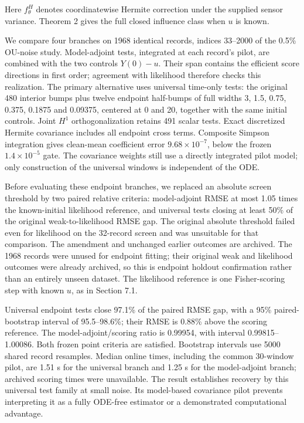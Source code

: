 \documentclass[
  american,
  11pt,
]{article}
\begin{document}
Here \(f_\theta^H\) denotes coordinatewise Hermite correction under the
supplied sensor variance. Theorem 2 gives the full closed influence
class when \(u\) is known.

We compare four branches on 1968 identical records, indices 33--2000 of
the 0.5\% OU-noise study. Model-adjoint tests, integrated at each
record's pilot, are combined with the two controls \(Y(0)-u\). Their
span contains the efficient score directions in first order; agreement
with likelihood therefore checks this realization. The primary
alternative uses universal time-only tests: the original 480 interior
bumps plus twelve endpoint half-bumps of full widths 3, 1.5, 0.75,
0.375, 0.1875 and 0.09375, centered at 0 and 20, together with the same
initial controls. Joint \(H^1\) orthogonalization retains 491 scalar
tests. Exact discretized Hermite covariance includes all endpoint cross
terms. Composite Simpson integration gives clean-mean coefficient error
\(9.68\times10^{-7}\), below the frozen \(1.4\times10^{-5}\) gate. The
covariance weights still use a directly integrated pilot model; only
construction of the universal windows is independent of the ODE.

Before evaluating these endpoint branches, we replaced an absolute
screen threshold by two paired relative criteria: model-adjoint RMSE at
most 1.05 times the known-initial likelihood reference, and universal
tests closing at least 50\% of the original weak-to-likelihood RMSE gap.
The original absolute threshold failed even for likelihood on the
32-record screen and was unsuitable for that comparison. The amendment
and unchanged earlier outcomes are archived. The 1968 records were
unused for endpoint fitting; their original weak and likelihood outcomes
were already archived, so this is endpoint holdout confirmation rather
than an entirely unseen dataset. The likelihood reference is one
Fisher-scoring step with known \(u\), as in Section 7.1.

Universal endpoint tests close 97.1\% of the paired RMSE gap, with a
95\% paired-bootstrap interval of 95.5--98.6\%; their RMSE is 0.88\%
above the scoring reference. The model-adjoint/scoring ratio is 0.99954,
with interval 0.99815--1.00086. Both frozen point criteria are
satisfied. Bootstrap intervals use 5000 shared record resamples. Median
online times, including the common 30-window pilot, are 1.51 s for the
universal branch and 1.25 s for the model-adjoint branch; archived
scoring times were unavailable. The result establishes recovery by this
universal test family at small noise. Its model-based covariance pilot
prevents interpreting it as a fully ODE-free estimator or a demonstrated
computational advantage.
\end{document}
